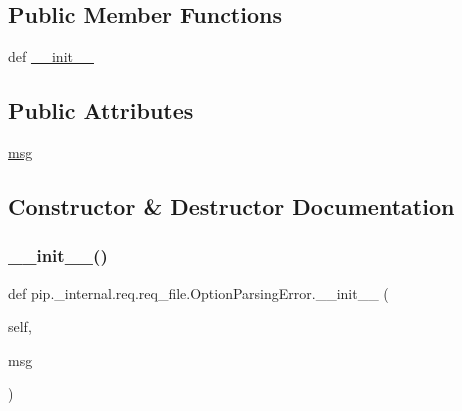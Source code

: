 \subsection*{Public Member Functions}
\begin{DoxyCompactItemize}
\item 
def \hyperlink{classpip_1_1__internal_1_1req_1_1req__file_1_1OptionParsingError_a90e51430a36f7c208dd0ddb6a28b6049}{\+\_\+\+\_\+init\+\_\+\+\_\+}
\end{DoxyCompactItemize}
\subsection*{Public Attributes}
\begin{DoxyCompactItemize}
\item 
\hyperlink{classpip_1_1__internal_1_1req_1_1req__file_1_1OptionParsingError_ac3ece318e60a6f5434428928d2b296fe}{msg}
\end{DoxyCompactItemize}


\subsection{Constructor \& Destructor Documentation}
\mbox{\label{classpip_1_1__internal_1_1req_1_1req__file_1_1OptionParsingError_a90e51430a36f7c208dd0ddb6a28b6049}} 
\subsubsection{\texorpdfstring{\+\_\+\+\_\+init\+\_\+\+\_\+()}{\_\_init\_\_()}}
{\footnotesize\ttfamily def pip.\+\_\+internal.\+req.\+req\+\_\+file.\+Option\+Parsing\+Error.\+\_\+\+\_\+init\+\_\+\+\_\+ (\begin{DoxyParamCaption}\item[{}]{self,  }\item[{}]{msg }\end{DoxyParamCaption})}



